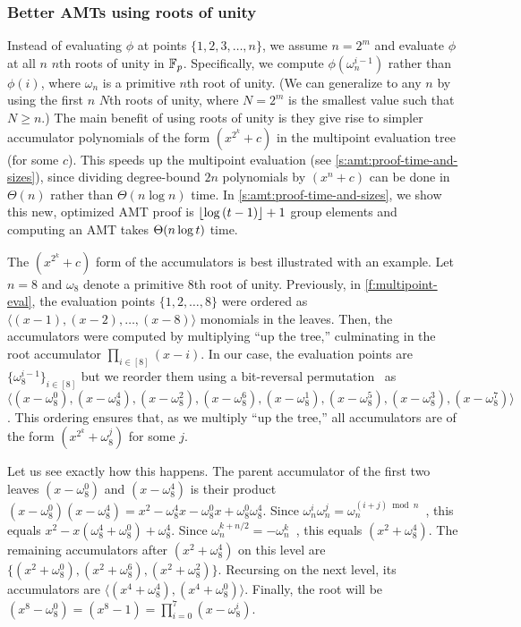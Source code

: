 \subsubsection{Better AMTs using roots of unity}
\label{s:amt:roots-of-unity}
Instead of evaluating $\phi$ at points $\{1,2,3,\dots,n\}$, we assume $n=2^m$ and evaluate $\phi$ at all $n$ $n$th roots of unity in $\mathbb{F}_p$.
Specifically, we compute $\phi(\omega_n^{i-1})$ rather than $\phi(i)$, where $\omega_n$ is a primitive $n$th root of unity.
(We can generalize to any $n$ by using the first $n$ $N$th roots of unity, where $N=2^m$ is the smallest value such that $N\ge n$.)
The main benefit of using roots of unity is they give rise to simpler accumulator polynomials of the form $(x^{2^k} + c)$ in the multipoint evaluation tree (for some $c$).
This speeds up the multipoint evaluation (see \cref{s:amt:proof-time-and-sizes}), since dividing degree-bound $2n$ polynomials by $(x^n + c)$ can be done in $\Theta(n)$ rather than $\Theta(n\log{n})$ time.
In \cref{s:amt:proof-time-and-sizes}, we show this new, optimized AMT proof is $\lfloor\log{(t-1)}\rfloor + 1$ group elements and computing an AMT takes $\Theta(n\log{t})$ time.

The $(x^{2^k} + c)$ form of the accumulators is best illustrated with an example.
Let $n=8$ and $\omega_8$ denote a primitive 8th root of unity.
Previously, in \cref{f:multipoint-eval}, the evaluation points $\{1,2,\dots,8\}$ were ordered as $\langle (x-1), (x-2),\dots, (x-8)\rangle$ monomials in the leaves.
Then, the accumulators were computed by multiplying ``up the tree,'' culminating in the root accumulator $\prod_{i\in[8]}(x-i)$.
In our case, the evaluation points are $\{\omega_8^{i-1}\}_{i\in[8]}$ but we reorder them using a bit-reversal permutation~\cite{bitreversal-wiki} as $\langle(x-\omega_8^0), (x-\omega_8^4), (x-\omega_8^2), (x-\omega_8^6), (x-\omega_8^1), (x-\omega_8^5), (x-\omega_8^3), (x-\omega_8^7)\rangle$.
This ordering ensures that, as we multiply ``up the tree,'' all accumulators are of the form $(x^{2^k} + \omega_8^j)$ for some $j$.

Let us see exactly how this happens.
The parent accumulator of the first two leaves $(x-\omega_8^0)$ and $(x-\omega_8^4)$ is their product $(x-\omega_8^0)(x-\omega_8^4) = x^2 - \omega_8^4 x - \omega_8^0 x + \omega_8^0 \omega_8^4$.
Since $\omega_n^i \omega_n^j = \omega_n^{(i+j) \bmod n}$~\cite{CLRS09}, this equals $x^2 - x(\omega_8^4 + \omega_8^0) + \omega_8^4$.
Since $\omega_n^{k+n/2} = -\omega_n^k$~\cite{CLRS09}, this equals $(x^2 + \omega_8^4)$.
The remaining accumulators after $(x^2 + \omega_8^4)$ on this level are $\{(x^2 + \omega_8^0), (x^2 + \omega_8^6), (x^2 + \omega_8^2)\}$.
Recursing on the next level, its accumulators are $\langle(x^4 + \omega_8^4),(x^4 + \omega_8^0)\rangle$.
Finally, the root will be $(x^8-\omega_8^0) = (x^8 - 1) = \prod_{i=0}^{7}(x-\omega_8^i)$.


